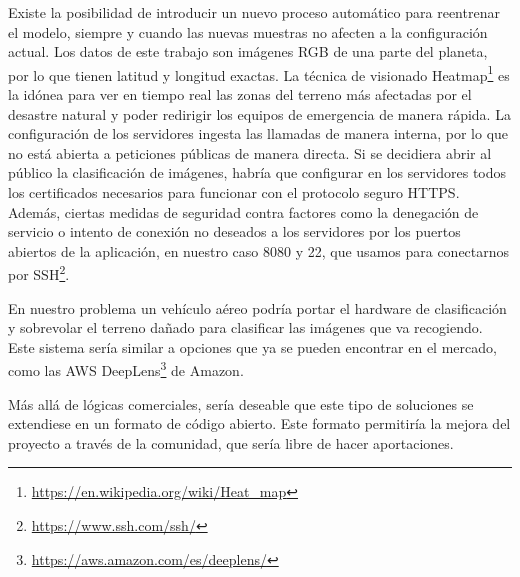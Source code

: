 Existe la posibilidad de introducir un nuevo proceso automático para reentrenar el modelo, siempre y cuando las nuevas muestras no afecten a la configuración actual.
Los datos de este trabajo son imágenes RGB de una parte del planeta, por lo que tienen latitud y longitud exactas.
La técnica de visionado Heatmap\footnote{\url{https://en.wikipedia.org/wiki/Heat\_map}} es la idónea para ver en tiempo real las zonas del terreno más afectadas por el desastre natural y poder redirigir los equipos de emergencia de manera rápida.
La configuración de los servidores ingesta las llamadas de manera interna, por lo que no está abierta a peticiones públicas de manera directa.
Si se decidiera abrir al público la clasificación de imágenes, habría que configurar en los servidores todos los certificados necesarios para funcionar con el protocolo seguro HTTPS. Además, ciertas medidas de seguridad contra factores como la denegación de servicio o intento de conexión no deseados a los servidores por los puertos abiertos de la aplicación, en nuestro caso 8080 y 22, que usamos para conectarnos por SSH\footnote{\url{https://www.ssh.com/ssh/}}.

En nuestro problema un vehículo aéreo podría portar el hardware de clasificación y sobrevolar el terreno dañado para clasificar las imágenes que va recogiendo.
Este sistema sería similar a opciones que ya se pueden encontrar en el mercado, como las AWS DeepLens\footnote{\url{https://aws.amazon.com/es/deeplens/}} de Amazon.

Más allá de lógicas comerciales, sería deseable que este tipo de soluciones se extendiese en un formato de código abierto. Este formato permitiría la mejora del proyecto a través de la comunidad, que sería libre de hacer aportaciones.

